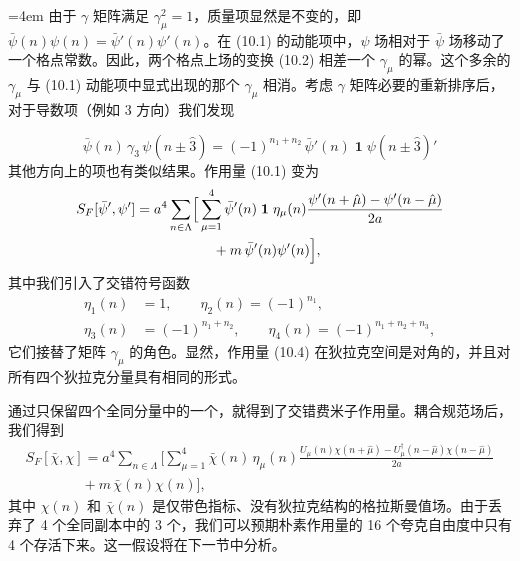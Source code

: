 \begingroup\emergencystretch=4em 由于 $\gamma$ 矩阵满足 $\gamma_\mu^2 = 1$，质量项显然是不变的，即\linebreak[0] $\bar\psi(n)\psi(n) = \bar\psi'(n)\psi'(n)$。在 (10.1) 的动能项中，$\psi$ 场相对于 $\bar\psi$ 场移动了一个格点常数。因此，两个格点上场的变换 (10.2) 相差一个 $\gamma_\mu$ 的幂。这个多余的 $\gamma_\mu$ 与 (10.1) 动能项中显式出现的那个 $\gamma_\mu$ 相消。考虑 $\gamma$ 矩阵必要的重新排序后，对于导数项（例如 3 方向）我们发现\par\endgroup
\begin{equation}
  \bar\psi(n)\, \gamma_3\, \psi(n \pm \hat{3})
  = (-1)^{n_1 + n_2}\, \bar\psi'(n)\; \mathbf{1} \;
  \psi(n \pm \hat{3})'
\end{equation}
其他方向上的项也有类似结果。作用量 (10.1) 变为
\begin{equation}
  \begin{split}
    S_F[\bar\psi', \psi'] = a^4 \sum_{n\in\Lambda}
    \Bigl[ &\sum_{\mu=1}^{4} \bar\psi'(n)\; \mathbf{1} \;
      \eta_\mu(n) \frac{\psi'(n+\hat\mu) - \psi'(n-\hat\mu)}{2a}\\
    &\quad + m\,\bar\psi'(n)\psi'(n)
    \Bigr] ,
  \end{split}
\end{equation}
其中我们引入了交错符号函数
\begin{equation}
  \begin{aligned}
    \eta_1(n) &= 1 , \qquad \eta_2(n) = (-1)^{n_1} , \\
    \eta_3(n) &= (-1)^{n_1 + n_2} , \qquad
    \eta_4(n) = (-1)^{n_1 + n_2 + n_3} ,
  \end{aligned}
\end{equation}
它们接替了矩阵 $\gamma_\mu$ 的角色。显然，作用量 (10.4) 在狄拉克空间是对角的，并且对所有四个狄拉克分量具有相同的形式。

通过只保留四个全同分量中的一个，就得到了交错费米子作用量。耦合规范场后，我们得到
\begin{multline}
  S_F[\bar\chi, \chi] = a^4 \sum_{n\in\Lambda}
  \Bigg[
    \sum_{\mu=1}^{4} \bar\chi(n)\, \eta_\mu(n)
    \frac{U_\mu(n)\chi(n+\hat\mu) - U_\mu^{\dagger}(n-\hat\mu)\chi(n-\hat\mu)}{2a}
  \\
  \qquad\qquad + m\,\bar\chi(n)\chi(n)
  \Bigg] ,
\end{multline}
其中 $\chi(n)$ 和 $\bar\chi(n)$ 是仅带色指标、没有狄拉克结构的格拉斯曼值场。由于丢弃了 4 个全同副本中的 3 个，我们可以预期朴素作用量的 16 个夸克自由度中只有 4 个存活下来。这一假设将在下一节中分析。

